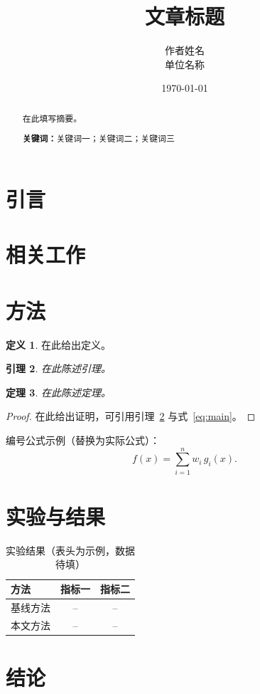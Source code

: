 \documentclass[UTF8,fontset=fandol,a4paper]{ctexart}
\title{文章标题}
\author{作者姓名\\单位名称}
\date{\today}
\theoremstyle{plain}
\newtheorem{theorem}{定理}[section]
\newtheorem{lemma}[theorem]{引理}
\theoremstyle{definition}
\newtheorem{definition}[theorem]{定义}
\begin{document}
\maketitle

\begin{abstract}
在此填写摘要。

\medskip
\noindent\textbf{关键词：}关键词一；关键词二；关键词三
\end{abstract}

\section{引言}

\section{相关工作}

\section{方法}
\begin{definition}\label{def:main}
在此给出定义。
\end{definition}

\begin{lemma}\label{lem:main}
在此陈述引理。
\end{lemma}

\begin{theorem}\label{thm:main}
在此陈述定理。
\end{theorem}

\begin{proof}
在此给出证明，可引用引理~\ref{lem:main} 与式~\eqref{eq:main}。
\end{proof}

编号公式示例（替换为实际公式）：
\begin{equation}\label{eq:main}
  f(x) = \sum_{i=1}^{n} w_i\, g_i(x) .
\end{equation}

\section{实验与结果}
\begin{table}[htbp]
  \centering
  \caption{实验结果（表头为示例，数据待填）}
  \label{tab:results}
  \begin{tabular}{lcc}
    \toprule
    方法     & 指标一 & 指标二 \\
    \midrule
    基线方法 & --     & --     \\
    本文方法 & --     & --     \\
    \bottomrule
  \end{tabular}
\end{table}


\section{结论}



\end{document}
